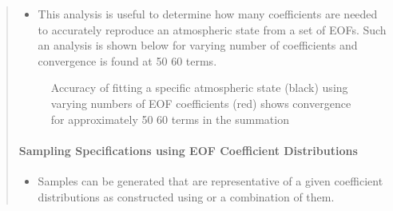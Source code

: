 \documentclass[letterpaper,10pt,english]{sphinxmanual}
\let\sphinxpxdimen\pdfpxdimen\else\newdimen\sphinxpxdimen
\begin{document}
\begin{itemize}
\begin{quote}
\begin{itemize}
\end{itemize}

\begin{sphinxVerbatim}[commandchars=\\\{\}]
  
  

   
\end{sphinxVerbatim}
\begin{itemize}
\item {} 
\sphinxAtStartPar
This analysis is useful to determine how many coefficients are needed to accurately reproduce an atmospheric state from a set of EOFs.  Such an analysis is shown below for varying number of coefficients and convergence is found at 50 \sphinxhyphen{} 60 terms.

\end{itemize}

\begin{figure}[htbp]
\centering
\capstart

\noindent\sphinxincludegraphics[width=700\sphinxpxdimen]{{US_NE-fits}.png}
\caption{Accuracy of fitting a specific atmospheric state (black) using varying numbers of EOF coefficients (red) shows convergence for approximately 50 \sphinxhyphen{} 60 terms in the summation}\label{\detokenize{sampling:id1}}\end{figure}


\paragraph{Sampling Specifications using EOF Coefficient Distributions}
\label{\detokenize{sampling:sampling-specifications-using-eof-coefficient-distributions}}\begin{itemize}
\item {} 
\sphinxAtStartPar
Samples can be generated that are representative of a given coefficient distributions as constructed using  or a combination of them.


\end{itemize}
\end{quote}
\end{itemize}
\end{document}
